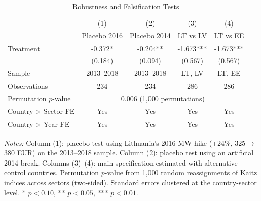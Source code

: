 \begin{table}[H]
\centering
\caption{Robustness and Falsification Tests}
\label{tab:robust}
\begin{threeparttable}
\begin{tabular}{lcccc}
\toprule
& (1) & (2) & (3) & (4) \\
& Placebo 2016 & Placebo 2014 & LT vs LV & LT vs EE \\
\midrule
Treatment & -0.372* & -0.204** & -1.673*** & -1.673*** \\
& (0.184) & (0.094) & (0.567) & (0.567) \\
\midrule
Sample & 2013--2018 & 2013--2018 & LT, LV & LT, EE \\
Observations & 234 & 234 & 286 & 286 \\
Permutation $p$-value & \multicolumn{4}{c}{0.006 (1,000 permutations)} \\
Country $\times$ Sector FE & Yes & Yes & Yes & Yes \\
Country $\times$ Year FE & Yes & Yes & Yes & Yes \\
\bottomrule
\end{tabular}
\begin{tablenotes}[flushleft]
\small
\item \textit{Notes:} Column (1): placebo test using Lithuania's 2016 MW hike (+24\%, 325$\to$380 EUR) on the 2013--2018 sample. Column (2): placebo test using an artificial 2014 break. Columns (3)--(4): main specification estimated with alternative control countries. Permutation $p$-value from 1,000 random reassignments of Kaitz indices across sectors (two-sided). Standard errors clustered at the country-sector level. * $p<0.10$, ** $p<0.05$, *** $p<0.01$.
\end{tablenotes}
\end{threeparttable}
\end{table}
